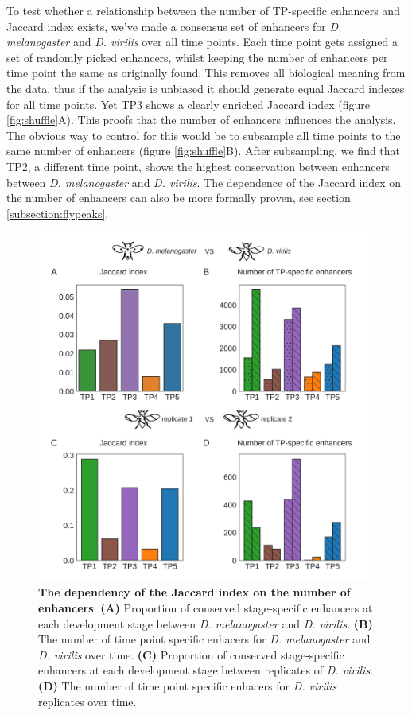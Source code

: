 To test whether a relationship between the number of TP-specific enhancers and Jaccard index exists, we've made a consensus set of enhancers for \textit{D. melanogaster} and \textit{D. virilis} over all time points. Each time point gets assigned a set of randomly picked enhancers, whilst keeping the number of enhancers per time point the same as originally found. This removes all biological meaning from the data, thus if the analysis is unbiased it should generate equal Jaccard indexes for all time points. Yet TP3 shows a clearly enriched Jaccard index (figure \ref{fig:shuffle}A). This proofs that the number of enhancers influences the analysis. The obvious way to control for this would be to subsample all time points to the same number of enhancers (figure \ref{fig:shuffle}B). After subsampling, we find that TP2, a different time point, shows the highest conservation between enhancers between \textit{D. melanogaster} and \textit{D. virilis}. The dependence of the Jaccard index on the number of enhancers can also be more formally proven, see section \ref{subsection:flypeaks}. 

\begin{figure}[H]
    \includegraphics[width=\linewidth]{ch.hourglass/images/fly_control_2.png}
    \caption{\textbf{The dependency of the Jaccard index on the number of enhancers}. \textbf{(A)} Proportion of conserved stage-specific enhancers at each development stage between \textit{D. melanogaster} and \textit{D. virilis}. \textbf{(B)} The number of time point specific enhacers for \textit{D. melanogaster} and \textit{D. virilis} over time. \textbf{(C)} Proportion of conserved stage-specific enhancers at each development stage between replicates of \textit{D. virilis}. \textbf{(D)} The number of time point specific enhacers for \textit{D. virilis} replicates over time. }
    \label{fig:peak_null}
\end{figure}

